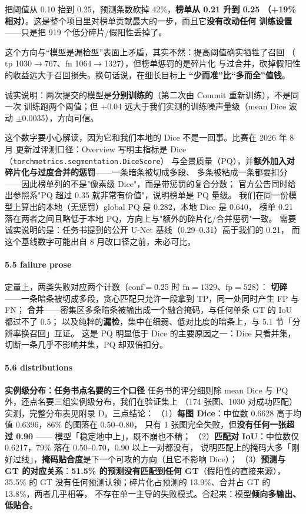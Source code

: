 \documentclass{article}
\begin{document}
把阈值从 0.10 抬到 0.25，预测条数砍掉 42\%，\textbf{榜单从 0.21 升到 0.25
（+19\% 相对）}。这是整个项目里对榜单贡献最大的一步，而且它\textbf{没有改动任何
训练设置}——只是把 919 个低分碎片/假阳性丢掉了。

这个方向与“模型是漏检型”表面上矛盾，其实不然：提高阈值确实牺牲了召回
（$\mathrm{tp}$ 1030$\to$767、$\mathrm{fn}$ 1064$\to$1327），但榜单惩罚的是碎片化
与过合并，砍掉假阳性的收益远大于召回损失。换句话说，在细长目标上
\textbf{“少而准”比“多而全”值钱}。

诚实说明：两次提交的模型是\textbf{分别训练的}（第二次由 Commit 重新训练），不是同一次
训练跑两个阈值；但 +0.04 远大于我们实测的训练噪声量级（mean Dice 波动
$\pm$0.0035），方向可信。

这个数字要小心解读，因为它和我们本地的 Dice 不是一回事。比赛在 2026 年 8 月
更新过评测口径：Overview 写明主指标是 Dice（\texttt{torchmetrics.segmentation.DiceScore}）
与全景质量（PQ），并\textbf{额外加入对碎片化与过度合并的惩罚}——一条暗条被切成多段、
多条被粘成一条都要扣分——因此榜单列的不是"像素级 Dice"，而是带惩罚的复合分数；
官方公告同时给出参照系"PQ 超过 0.35 就非常有价值"，说明榜单是 PQ 量级。
我们在同一份模型上算出的本地（无惩罚）global PQ 是 0.282，本地 Dice 是 0.640，
榜单 0.21 落在两者之间且略低于本地 PQ，方向上与"额外的碎片化/合并惩罚"一致。
需要诚实说明的是：任务书提到的公开 U-Net 基线（0.29--0.31）高于我们的 0.21，
而这个基线数字可能出自 8 月改口径之前，未必可比。

\paragraph{5.5 failure prose}

定量上，两类失败对应两个计数（conf$=$0.25 时 $\mathrm{fn}=1329$、$\mathrm{fp}=528$）：
\textbf{切碎}——一条暗条被切成多段，贪心匹配只允许一段拿到 TP，同一处同时产生 FP 与 FN；
\textbf{合并}——密集区多条暗条被输出成一个融合掩码，与任何单条 GT 的 IoU 都过不了 0.5；
以及纯粹的\textbf{漏检}，集中在细弱、低对比度的暗条上，与 5.1 节「分辨率换召回」互证。
这是 PQ 明显低于 Dice 的主要原因之一：Dice 只看并集，切断一条几乎不影响并集，PQ 却双倍扣分。

\paragraph{5.6 distributions}
\textbf{实例级分布：任务书点名要的三个口径}
任务书的评分细则除 mean Dice 与 PQ 外，还点名要三组实例级分布，我们在验证集上
（174 张图、1030 对成功匹配）实测，完整分布表见附录 D。三点结论：
（1）\textbf{每图 Dice}：中位数 0.6628 高于均值 0.6396，86\% 的图落在 0.50--0.80，
只有 1 张图完全失败，但\textbf{没有任何一张超过 0.90} —— 模型「稳定地中上」，既不崩也不精；
（2）\textbf{匹配对 IoU}：中位数仅 0.6217，79\% 落在 0.50--0.70，0.90 以上一对都没有，
说明匹配上的掩码大多「刚好过线」，\textbf{掩码贴合度}是下一个可攻的方向（且它不影响 Dice）；
（3）\textbf{预测与 GT 的对应关系}：\textbf{51.5\% 的预测没有匹配到任何 GT}（假阳性的直接来源），
35.5\% 的 GT 没有任何预测认领；碎片化占预测的 13.9\%、合并占 GT 的 13.8\%，两者几乎相等，
不存在单一主导的失败模式。合起来：模型\textbf{倾向多输出、低贴合}。
\end{document}
